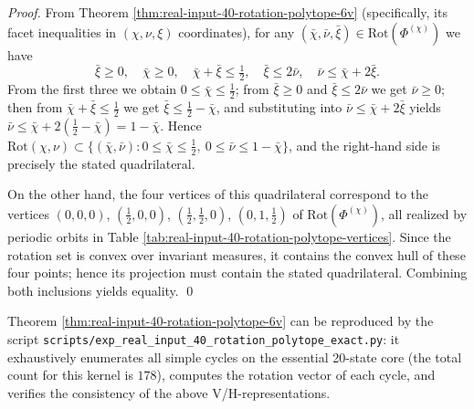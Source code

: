 \begin{proof}
From Theorem \ref{thm:real-input-40-rotation-polytope-6v} (specifically, its facet inequalities in \((\chi,\nu,\xi)\) coordinates), for any
\((\bar\chi,\bar\nu,\bar\xi)\in\mathrm{Rot}(\Phi^{(\chi)})\) we have
\[
\bar\xi\ge 0,\quad
\bar\chi\ge 0,\quad
\bar\chi+\bar\xi\le \tfrac12,\quad
\bar\xi\le 2\bar\nu,\quad
\bar\nu\le \bar\chi+2\bar\xi.
\]
From the first three we obtain \(0\le \bar\chi\le \tfrac12\); from \(\bar\xi\ge 0\) and \(\bar\xi\le 2\bar\nu\) we get \(\bar\nu\ge 0\);
then from \(\bar\chi+\bar\xi\le \tfrac12\) we get \(\bar\xi\le \tfrac12-\bar\chi\), and substituting into \(\bar\nu\le \bar\chi+2\bar\xi\) yields
\(\bar\nu\le \bar\chi+2(\tfrac12-\bar\chi)=1-\bar\chi\).
Hence \(\mathrm{Rot}(\chi,\nu)\subset\{(\bar\chi,\bar\nu):0\le \bar\chi\le \tfrac12,\ 0\le \bar\nu\le 1-\bar\chi\}\), and the right-hand side is precisely the stated quadrilateral.

On the other hand, the four vertices of this quadrilateral correspond to the vertices
\((0,0,0)\), \((\tfrac12,0,0)\), \((\tfrac12,\tfrac12,0)\), \((0,1,\tfrac12)\) of \(\mathrm{Rot}(\Phi^{(\chi)})\), all realized by periodic orbits in Table \ref{tab:real-input-40-rotation-polytope-vertices}.
Since the rotation set is convex over invariant measures, it contains the convex hull of these four points; hence its projection must contain the stated quadrilateral.
Combining both inclusions yields equality. \qed
\end{proof}

\begin{remark}\label{rem:real-input-40-rotation-polytope-exact-repro}
Theorem \ref{thm:real-input-40-rotation-polytope-6v} can be reproduced by the script \texttt{scripts/exp\_real\_input\_40\_rotation\_polytope\_exact.py}: it exhaustively enumerates all simple cycles on the essential 20-state core (the total count for this kernel is \(178\)), computes the rotation vector of each cycle, and verifies the consistency of the above V/H-representations.
\end{remark}

